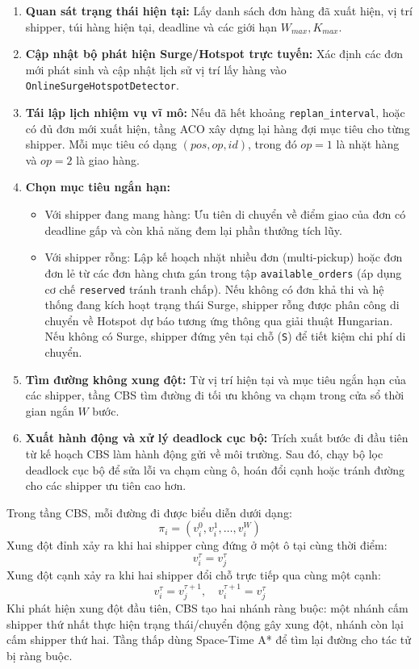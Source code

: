 \documentclass[conference]{IEEEtran}
\begin{document}
\begin{enumerate}
    \item \textbf{Quan sát trạng thái hiện tại:} Lấy danh sách đơn hàng đã xuất hiện, vị trí shipper, túi hàng hiện tại, deadline và các giới hạn $W_{max}, K_{max}$.
    \item \textbf{Cập nhật bộ phát hiện Surge/Hotspot trực tuyến:} Xác định các đơn mới phát sinh và cập nhật lịch sử vị trí lấy hàng vào \texttt{OnlineSurgeHotspotDetector}.
    \item \textbf{Tái lập lịch nhiệm vụ vĩ mô:} Nếu đã hết khoảng \texttt{replan\_interval}, hoặc có đủ đơn mới xuất hiện, tầng ACO xây dựng lại hàng đợi mục tiêu cho từng shipper. Mỗi mục tiêu có dạng $(pos, op, id)$, trong đó $op=1$ là nhặt hàng và $op=2$ là giao hàng.
    \item \textbf{Chọn mục tiêu ngắn hạn:} 
        \begin{itemize}
            \item Với shipper đang mang hàng: Ưu tiên di chuyển về điểm giao của đơn có deadline gấp và còn khả năng đem lại phần thưởng tích lũy.
            \item Với shipper rỗng: Lập kế hoạch nhặt nhiều đơn (multi-pickup) hoặc đơn đơn lẻ từ các đơn hàng chưa gán trong tập \texttt{available\_orders} (áp dụng cơ chế \texttt{reserved} tránh tranh chấp). Nếu không có đơn khả thi và hệ thống đang kích hoạt trạng thái Surge, shipper rỗng được phân công di chuyển về Hotspot dự báo tương ứng thông qua giải thuật Hungarian. Nếu không có Surge, shipper đứng yên tại chỗ (\texttt{S}) để tiết kiệm chi phí di chuyển.
        \end{itemize}
    \item \textbf{Tìm đường không xung đột:} Từ vị trí hiện tại và mục tiêu ngắn hạn của các shipper, tầng CBS tìm đường đi tối ưu không va chạm trong cửa sổ thời gian ngắn $W$ bước.
    \item \textbf{Xuất hành động và xử lý deadlock cục bộ:} Trích xuất bước đi đầu tiên từ kế hoạch CBS làm hành động gửi về môi trường. Sau đó, chạy bộ lọc deadlock cục bộ để sửa lỗi va chạm cùng ô, hoán đổi cạnh hoặc tránh đường cho các shipper ưu tiên cao hơn.
\end{enumerate}

Trong tầng CBS, mỗi đường đi được biểu diễn dưới dạng:
\begin{equation}
\pi_i = (v_i^0, v_i^1, \ldots, v_i^W)
\end{equation}
Xung đột đỉnh xảy ra khi hai shipper cùng đứng ở một ô tại cùng thời điểm:
\begin{equation}
v_i^\tau = v_j^\tau
\end{equation}
Xung đột cạnh xảy ra khi hai shipper đổi chỗ trực tiếp qua cùng một cạnh:
\begin{equation}
v_i^\tau = v_j^{\tau+1}, \quad v_i^{\tau+1} = v_j^\tau
\end{equation}
Khi phát hiện xung đột đầu tiên, CBS tạo hai nhánh ràng buộc: một nhánh cấm shipper thứ nhất thực hiện trạng thái/chuyển động gây xung đột, nhánh còn lại cấm shipper thứ hai. Tầng thấp dùng Space-Time A* để tìm lại đường cho tác tử bị ràng buộc.
\end{document}
